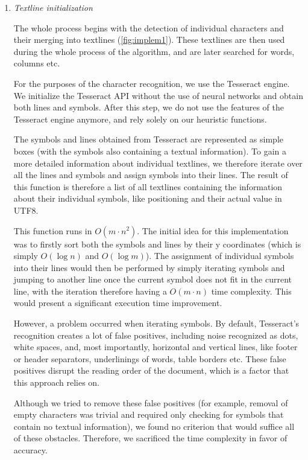 \begin{enumerate}
\item \emph{Textline initialization}


The whole process begins with the detection of individual characters and their merging into textlines (\cref{fig:implem1}). These textlines are then used during the whole process of the algorithm, and are later searched for words, columns etc.

For the purposes of the character recognition, we use the Tesseract engine. We initialize the Tesseract API without the use of neural networks and obtain both lines and symbols. After this step, we do not use the features of the Tesseract engine anymore, and rely solely on our heuristic functions.

The symbols and lines obtained from Tesseract are represented as simple boxes (with the symbols also containing a textual information). To gain a more detailed information about individual textlines, we therefore iterate over all the lines and symbols and assign symbols into their lines. The result of this function is therefore a list of all textlines containing the information about their individual symbols, like positioning and their actual value in UTF8.

This function runs in $O(m\cdot n^2)$. The initial idea for this implementation was to firstly sort both the symbols and lines by their y coordinates (which is simply $O(\log n)$ and  $O(\log m)$). The assignment of individual symbols into their lines would then be performed by simply iterating symbols and jumping to another line once the current symbol does not fit in the current line, with the iteration therefore having a $O(m\cdot n)$ time complexity. This would present a significant execution time improvement.

However, a problem occurred when iterating symbols. By default, Tesseract's recognition creates a lot of false positives, including noise recognized as dots, white spaces, and, most importantly, horizontal and vertical lines, like footer or header separators, underlinings of words, table borders etc. These false positives disrupt the reading order of the document, which is a factor that this approach relies on.

Although we tried to remove these false positives (for example, removal of empty characters was trivial and required only checking for symbols that contain no textual information), we found no criterion that would suffice all of these obstacles. Therefore, we sacrificed the time complexity in favor of accuracy.


\end{enumerate}
